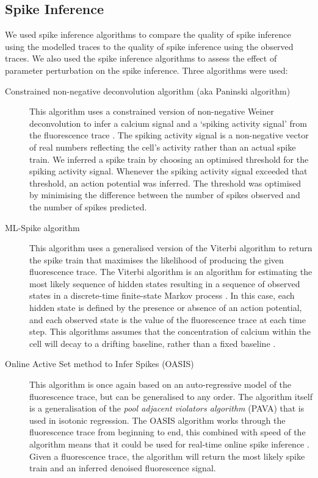 \documentclass[a4paper,12pt]{article}
\theoremstyle{definition}
\begin{document}
\subsection{Spike Inference}\label{sec:spike_inference_methods}
We used spike inference algorithms to compare the quality of spike inference using the modelled traces to the quality of spike inference using the observed traces. We also used the spike inference algorithms to assess the effect of parameter perturbation on the spike inference. Three algorithms were used:
\begin{description}
  \item[Constrained non-negative deconvolution algorithm (aka Paninski algorithm)] This algorithm uses a constrained version of non-negative Weiner deconvolution to infer a calcium signal and a `spiking activity signal' from the fluorescence trace \cite{pnevmatikakis, vogelstein}. The spiking activity signal is a non-negative vector of real numbers reflecting the cell's activity rather than an actual spike train. We inferred a spike train by choosing an optimised threshold for the spiking activity signal. Whenever the spiking activity signal exceeded that threshold, an action potential was inferred. The threshold was optimised by minimising the difference between the number of spikes observed and the number of spikes predicted.
  \item[ML-Spike algorithm] This algorithm uses a generalised version of the Viterbi algorithm to return the spike train that maximises the likelihood of producing the given fluorescence trace. The Viterbi algorithm is an algorithm for estimating the most likely sequence of hidden states resulting in a sequence of observed states in a discrete-time finite-state Markov process \cite{viterbi}. In this case, each hidden state is defined by the presence or absence of an action potential, and each observed state is the value of the fluorescence trace at each time step. This algorithms assumes that the concentration of calcium within the cell will decay to a drifting baseline, rather than a fixed baseline \cite{deneux}.
  \item[Online Active Set method to Infer Spikes (OASIS)] This algorithm is once again based on an auto-regressive model of the fluorescence trace, but can be generalised to any order. The algorithm itself is a generalisation of the \textit{pool adjacent violators algorithm} (PAVA) that is used in isotonic regression. The OASIS algorithm works through the fluorescence trace from beginning to end,
   this combined with speed of the algorithm means that it could be used for real-time online spike inference \cite{friedrich}. Given a fluorescence trace, the algorithm will return the most likely spike train and an inferred denoised fluorescence signal.
\end{description}
\end{document}
